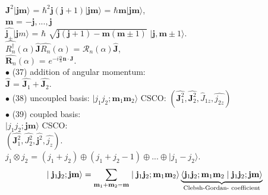 \documentclass[a4paper, 10pt, onepage]{elegantbook}
\begin{document}
{$\hat{\mathbf J^2} |{\mathbf {jm}} \rangle$ = $\hbar^2 \mathbf j(\mathbf j + 1) | \mathbf {jm} \rangle$ = $ \hbar \mathbf m | \mathbf {jm} \rangle$,  \\

$\mathbf m$ = $ - \mathbf j,...,\mathbf j$  \\

$\hat{\mathbf j_\pm} | {\mathbf jm} \rangle$ = $\hbar$ $\sqrt{{{\mathbf j} {(\mathbf j + 1)}} - {\mathbf m}{(\mathbf m \pm 1)}}$ $ | \mathbf j, \mathbf m \pm 1 \rangle$. \\

$\hat{R^\dagger_n}(\alpha) \hat{\mathbf J} \hat{R_n}(\alpha)$ = $\mathcal R_n (\alpha) \hat{\mathbf J}$,  \\ 

$\hat{\mathbf R_n}(\alpha)$ = $e^{ - i \frac{\alpha}{\hbar} {\mathbf n} \cdot {\mathbf J}}$. \\

$\bullet$ (37) addition of angular momentum:  \\ 

$\hat{\mathbf J}$ = $\hat{\mathbf J_1} + \hat{\mathbf J_2}$.  \\

$\bullet$ (38) uncoupled basis: $ | j_1 j_2; \mathbf m_1 \mathbf m_2 \rangle$ $\text{CSCO:}$ $(\hat{\mathbf J^2_1}, \hat{\mathbf J^2_2},
\hat J_{1z}, \hat{j_{2z}})$  \\

$\bullet$ (39) coupled basis:  \\

$\mid {j_1} {j_2 ;} \mathbf{jm} \rangle$ CSCO: \\

$(\hat{\mathbf J^2_1}, \hat{J^2_2}, \hat{\mathbf j^2}, \hat{j_z})$.  \\

$j_1 \otimes j_2$ = $(j_1 + j_2) \oplus  (j_1 + j_2 - 1)\oplus...\oplus \mid j_1 - j_2 \rangle$.  \\  

\begin{equation}
\mid  \mathbf j_1 \mathbf j_2; \mathbf{jm} \rangle = \sum_{\mathbf m_1 + \mathbf m_2 = \mathbf m} \mid {\mathbf j_1}{\mathbf j_2}; {\mathbf m_1}{\mathbf m_2} \rangle \underbrace{\langle{\mathbf j_1 \mathbf j_2}; {\mathbf m_1 \mathbf m_2} \mid {\mathbf j_1 \mathbf j_2}; \mathbf{jm} \rangle}_{\text{Clebsh-Gordan- coefficient\index{Clebsch-Gordan-coefficient}}}
\end{equation}

}
\end{document}
